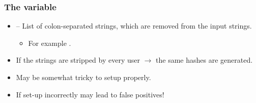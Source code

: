 \documentclass[compress,table,xcolor=table]{beamer}
\begin{document}
\begin{frame}
  \frametitle{The  variable}
  \Large
  \begin{itemize}
  \item {} -- List of colon-separated strings, which
      are removed from the input strings.
  \begin{itemize}
  \item For example .
  \end{itemize}
  \item If the  strings are stripped by every user $\rightarrow$
      the same hashes are generated.
  \item {\larger May be somewhat tricky to setup properly.}
  \item {\larger If set-up incorrectly may lead to false positives!}
  \end{itemize}
\end{frame}
\end{document}
